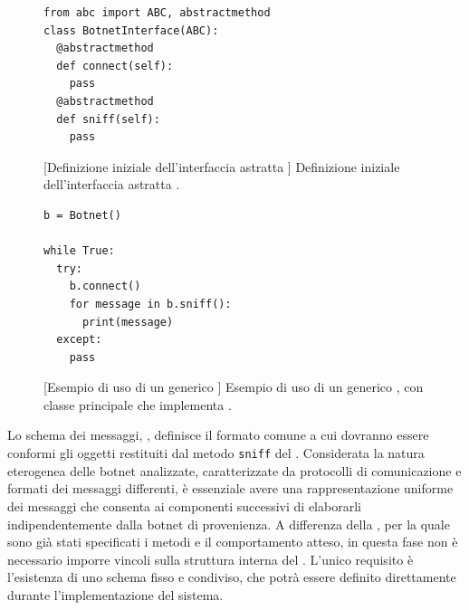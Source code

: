\begin{figure}[t]
    \centering

    \begin{minipage}{0.45\textwidth}
        \centering
        \begin{lstlisting}[frame=single, style=pystyle]
from abc import ABC, abstractmethod
class BotnetInterface(ABC):
  @abstractmethod
  def connect(self):
    pass
  @abstractmethod
  def sniff(self):
    pass
        \end{lstlisting}
        [Definizione iniziale dell'interfaccia astratta \interface{}]{
            Definizione iniziale dell'interfaccia astratta \interface{}. \\ \hspace{1em}
        }
        \label{fig:botnet_interface}
    \end{minipage}%
    \hspace{0.05\textwidth}%
    \begin{minipage}{0.45\textwidth}
        \centering
        \begin{lstlisting}[frame=single, style=pystyle]
b = Botnet()

while True:
  try:
    b.connect()
    for message in b.sniff():
      print(message)
  except:
    pass
        \end{lstlisting}
        [Esempio di uso di un generico \capture{}]{
            Esempio di uso di un generico \capture{}, con classe principale \botnet{} che implementa \interface{}.
        }
        \label{fig:botnet_main}
    \end{minipage}%
\end{figure}

Lo schema dei messaggi, \schema{}, definisce il formato comune a cui dovranno essere conformi gli oggetti restituiti dal metodo \texttt{sniff} del \capture{}. Considerata la natura eterogenea delle botnet analizzate, caratterizzate da protocolli di comunicazione e formati dei messaggi differenti, è essenziale avere una rappresentazione uniforme dei messaggi che consenta ai componenti successivi di elaborarli indipendentemente dalla botnet di provenienza. A differenza della \interface{}, per la quale sono già stati specificati i metodi e il comportamento atteso, in questa fase non è necessario imporre vincoli sulla struttura interna del \schema{}. L'unico requisito è l'esistenza di uno schema fisso e condiviso, che potrà essere definito direttamente durante l'implementazione del sistema.